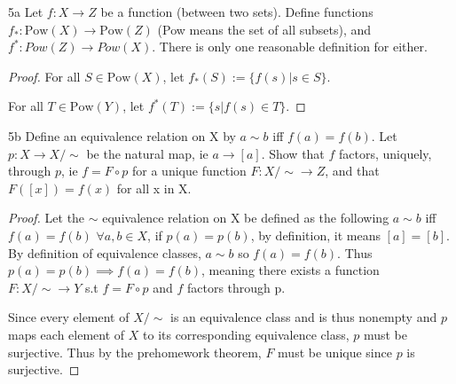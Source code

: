 \documentclass{article}
\newcommand{\rarr}[0]{\rightarrow}
\newcommand{\Pow}[1]{\text{Pow}(#1)}
\begin{document}
\begin{QU}{5a}\label{Question 5a.}
	Let $f: X \rarr Z$ be a function (between two sets). Define functions $f_*: \Pow{X} \rarr \Pow{Z}$ (Pow means the set of all subsets), and  $f^*: Pow(Z) \rarr Pow(X)$. There is only one reasonable definition for either.
\end{QU}
\begin{proof}
	For all $S \in \Pow{X}$, let $f_*(S) := \{f(s) | s \in S\}$.

	For all $T \in \Pow{Y}$, let $f^*(T) := \{ s | f(s) \in T\}$.
\end{proof}


\begin{QU}{5b}\label{Question 5b.}
	Define an equivalence relation on X by $a \sim b$ iff $f(a) = f(b)$. Let $p: X \rarr X/\sim$ be the natural map, ie $a \rarr [a]$. Show that $f$ factors, uniquely, through $p$,  ie $f = F \circ p$ for a unique function $F : X/\sim \rarr Z$, and that $F([x]) = f(x)$ for all x in X.
\end{QU}
\begin{proof}
	Let the $\sim$ equivalence relation on X be defined as the following $a \sim b$ iff $f(a) = f(b)$ $\forall a, b \in X$, if $p(a) = p(b)$, by definition, it means $[a] = [b]$. By definition of equivalence classes, $a \sim b$ so $f(a) = f(b)$. Thus $p(a) = p(b) \implies f(a) = f(b)$, meaning there exists a function $F: X/\sim \rarr Y$ s.t $f = F\circ p$ and $f$ factors through p. 

	Since every element of $X/\sim$ is an equivalence class and is thus nonempty and $p$ maps each element of $X$ to its corresponding equivalence class, $p$ must be surjective. Thus by the prehomework theorem, $F$ must be unique since $p$ is surjective.
\end{proof}
\end{document}
